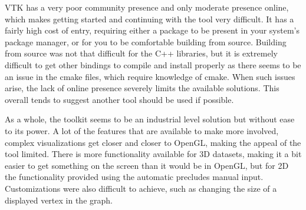 \documentclass[12pt]{article}
\begin{document}
    VTK has a very poor community presence and only moderate presence online, which makes getting started and continuing with the tool very difficult.  It has a fairly high cost of entry, requiring either a package to be present in your system's package manager, or for you to be comfortable building from source.  Building from source was not that difficult for the C++ libraries, but it is extremely difficult to get other bindings to compile and install properly as there seems to be an issue in the cmake files, which require knowledge of cmake.  When such issues arise, the lack of online presence severely limits the available solutions.  This overall tends to suggest another tool should be used if possible.

    As a whole, the toolkit seems to be an industrial level solution but without ease to its power.  A lot of the features that are available to make more involved, complex visualizations get closer and closer to OpenGL, making the appeal of the tool limited.  There is more functionality available for 3D datasets, making it a bit easier to get something on the screen than it would be in OpenGL, but for 2D the functionality provided using the automatic precludes manual input.  Customizations were also difficult to achieve, such as changing the size of a displayed vertex in the graph.
\end{document}
